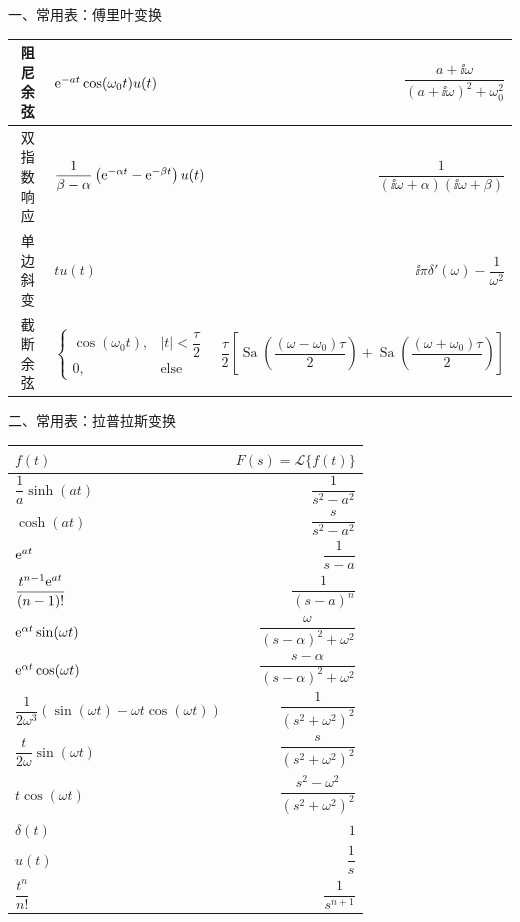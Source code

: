 \documentclass[a4paper]{ctexart}
\newcommand{\LT}{\mathcal{L}}
\newcommand{\Sa}{\operatorname{Sa}}
\begin{document}
\begin{cheatsheetcolumns}[2]
\begin{card}{一、常用表：傅里叶变换}
{\begin{tabularx}{\linewidth}{@{}S|M|R@{}}
      阻尼余弦 & $\mathrm{e}^{-at}\cos(\omega_0t)u(t)$
        & $\dfrac{a+\ii\omega}{(a+\ii\omega)^2+\omega_0^2}$ \\ \hline
      双指数响应 & $\dfrac{1}{\beta-\alpha}\left(\mathrm{e}^{-\alpha t}-\mathrm{e}^{-\beta t}\right)u(t)$
        & $\dfrac{1}{(\ii\omega+\alpha)(\ii\omega+\beta)}$ \\ \hline
      单边斜变 & $tu(t)$
        & $\ii\pi\delta'(\omega)-\dfrac{1}{\omega^2}$ \\ \hline
      截断余弦 & $\begin{cases}
          \cos(\omega_0t),& |t|<\dfrac{\tau}{2}\\
          0,&\text{else}
          \end{cases}$
        & $\dfrac{\tau}{2}\left[\Sa\!\left(\dfrac{(\omega-\omega_0)\tau}{2}\right)+\Sa\!\left(\dfrac{(\omega+\omega_0)\tau}{2}\right)\right]$ \\ \hline
    \end{tabularx}}
  \end{card}

  \begin{card}{二、常用表：拉普拉斯变换}
    {\scriptsize\setlength{\tabcolsep}{1pt}\renewcommand{\arraystretch}{1.08}
    \begin{tabularx}{\linewidth}{@{}M|R@{}}
      $f(t)$ & $F(s)=\LT\{f(t)\}$ \\ \hline
      $\dfrac{1}{a}\sinh(at)$
        & $\dfrac{1}{s^2-a^2}$ \\ \hline
      $\cosh(at)$
        & $\dfrac{s}{s^2-a^2}$ \\ \hline
      $\mathrm{e}^{at}$
        & $\dfrac{1}{s-a}$ \\ \hline
      $\dfrac{t^{n-1}\mathrm{e}^{at}}{(n-1)!}$
        & $\dfrac{1}{(s-a)^n}$ \\ \hline
      $\mathrm{e}^{\alpha t}\sin(\omega t)$
        & $\dfrac{\omega}{(s-\alpha)^2+\omega^2}$ \\ \hline
      $\mathrm{e}^{\alpha t}\cos(\omega t)$
        & $\dfrac{s-\alpha}{(s-\alpha)^2+\omega^2}$ \\ \hline
      $\dfrac{1}{2\omega^3}\left(\sin(\omega t)-\omega t\cos(\omega t)\right)$
        & $\dfrac{1}{(s^2+\omega^2)^2}$ \\ \hline
      $\dfrac{t}{2\omega}\sin(\omega t)$
        & $\dfrac{s}{(s^2+\omega^2)^2}$ \\ \hline
      $t\cos(\omega t)$
        & $\dfrac{s^2-\omega^2}{(s^2+\omega^2)^2}$ \\ \hline
      $\delta(t)$
        & $1$ \\ \hline
      $u(t)$
        & $\dfrac{1}{s}$ \\ \hline
      $\dfrac{t^n}{n!}$
        & $\dfrac{1}{s^{n+1}}$ \\ \hline
    \end{tabularx}}
  \end{card}
  \end{cheatsheetcolumns}
\end{document}
